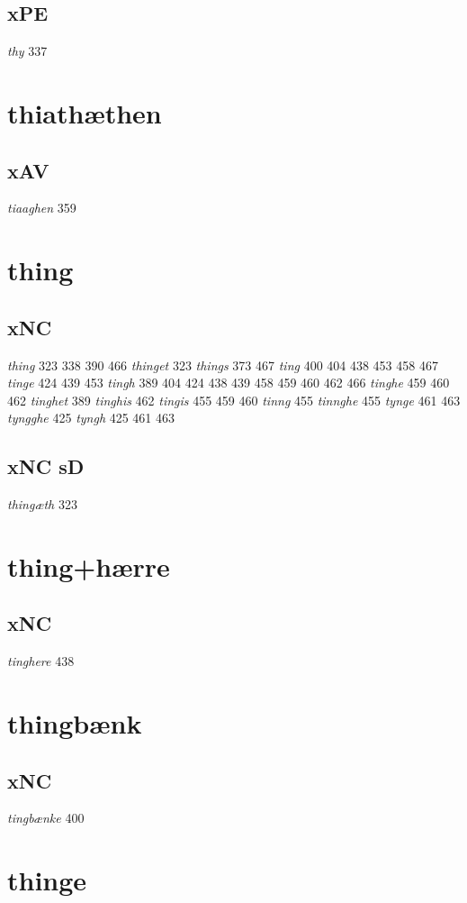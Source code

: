 \documentclass[a4paper,twocolumn]{article}
\begin{document}
\subsection{xPE}
\label{sec:org3817647}
\emph{thy} 337 
\section{thiathæthen}
\label{sec:org97f80c6}
\subsection{xAV}
\label{sec:orgf1615a9}
\emph{tiaaghen} 359 
\section{thing}
\label{sec:org6652c48}
\subsection{xNC}
\label{sec:org37dd2ba}
\emph{thing} 323 338 390 466 \emph{thinget} 323 \emph{things} 373 467 \emph{ting} 400 404 438 453 458 467 \emph{tinge} 424 439 453 \emph{tingh} 389 404 424 438 439 458 459 460 462 466 \emph{tinghe} 459 460 462 \emph{tinghet} 389 \emph{tinghis} 462 \emph{tingis} 455 459 460 \emph{tinng} 455 \emph{tinnghe} 455 \emph{tynge} 461 463 \emph{tyngghe} 425 \emph{tyngh} 425 461 463 
\subsection{xNC sD}
\label{sec:orgaea2ad1}
\emph{thingæth} 323 
\section{thing+hærre}
\label{sec:org5d9d2d3}
\subsection{xNC}
\label{sec:org0123e13}
\emph{tinghere} 438 
\section{thingbænk}
\label{sec:org9c4f0b9}
\subsection{xNC}
\label{sec:orga4b037b}
\emph{tingbænke} 400 
\section{thinge}
\label{sec:orgfe8d8ee}
\end{document}
